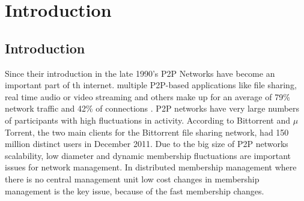 \chapter{Introduction} 
\label{chap:introduction}

\section{Introduction}
Since their introduction in the late 1990's P2P Networks have become an
important part of th internet. multiple P2P-based applications like file
sharing, real time audio or video streaming and others make up for an average of
79\% network traffic and 42\% of connections \cite{John+:InetTraffic}. P2P
networks have very large numbers of participants with high fluctuations in
activity. According to \cite{bittorrent} Bittorrent and $\mu$ Torrent, the two
main clients for the Bittorrent file sharing network, had 150 million distinct users in
December 2011. Due to the big size of P2P networks scalability, low diameter and
dynamic membership fluctuations are important issues for network management. In
distributed membership management where there is no central management unit low
cost changes in membership management is the key issue, because of the fast
membership changes.
